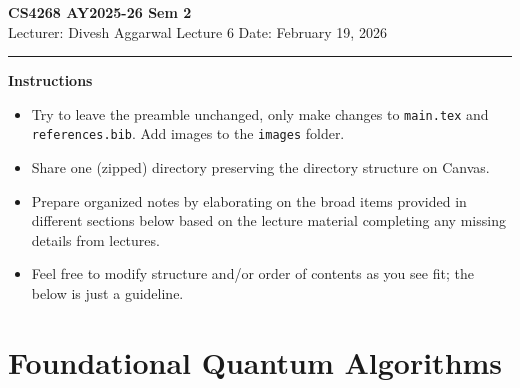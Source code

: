 



% 


\newpage
\noindent
\textbf{CS4268 AY2025-26 Sem 2}
\\
\noindent
Lecturer: Divesh Aggarwal
\hfill
Lecture 6                      %
\hfill
Date: February 19, 2026          %


\noindent
\rule{\textwidth}{1pt}

\medskip


\textbf{Instructions}\\
\begin{itemize}
    \item Try to leave the preamble unchanged, only make changes to \texttt{main.tex} and  \texttt{references.bib}. Add images to the \texttt{images} folder. 
    \item Share one (zipped) directory preserving the directory structure on Canvas. 
    \item Prepare organized notes by elaborating on the broad items provided in different sections below based on the lecture material completing any missing details from lectures.
    \item Feel free to modify structure and/or order of contents as you see fit; the below is just a guideline.
\end{itemize} 


\section{Foundational Quantum Algorithms}


